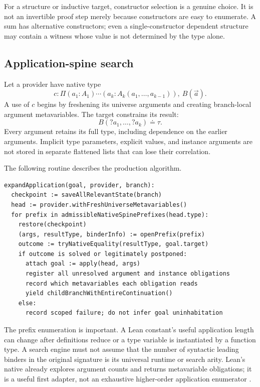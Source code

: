 \documentclass[11pt,a4paper]{article}
\newcommand{\code}[1]{\texttt{\detokenize{#1}}}
\theoremstyle{remark}
\begin{document}
For a structure or inductive target, constructor selection is a genuine choice. It is not an invertible proof step merely because constructors are easy to enumerate. A sum has alternative constructors; even a single-constructor dependent structure may contain a witness whose value is not determined by the type alone.

\subsection{Application-spine search}

Let a provider have native type
\[
 c:\Pi(a_1:A_1)\cdots(a_k:A_k(a_1,\ldots,a_{k-1})),\ B(\vec a).
\]
A use of $c$ begins by freshening its universe arguments and creating branch-local argument metavariables. The target constrains its result:
\[
 B(?a_1,\ldots,?a_k)\mathrel{\doteq}\tau.
\]
Every argument retains its full type, including dependence on the earlier arguments. Implicit type parameters, explicit values, and instance arguments are not stored in separate flattened lists that can lose their correlation.

The following routine describes the production algorithm.
\begin{lstlisting}
expandApplication(goal, provider, branch):
  checkpoint := saveAllRelevantState(branch)
  head := provider.withFreshUniverseMetavariables()
  for prefix in admissibleNativeSpinePrefixes(head.type):
    restore(checkpoint)
    (args, resultType, binderInfo) := openPrefix(prefix)
    outcome := tryNativeEquality(resultType, goal.target)
    if outcome is solved or legitimately postponed:
      attach goal := apply(head, args)
      register all unresolved argument and instance obligations
      record which metavariables each obligation reads
      yield childBranchWithEntireContinuation()
    else:
      record scoped failure; do not infer goal uninhabitation
\end{lstlisting}

The prefix enumeration is important. A Lean constant's useful application length can change after definitions reduce or a type variable is instantiated by a function type. A search engine must not assume that the number of syntactic leading binders in the original signature is its universal runtime or search arity. Lean's native \code{MVarId.apply} already explores argument counts and returns metavariable obligations; it is a useful first adapter, not an exhaustive higher-order application enumerator \cite{lean-apply}.
\end{document}
